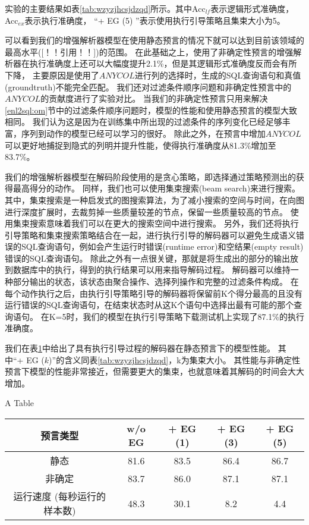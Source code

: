 实验的主要结果如表\ref{tab:wzyzjhcsjdzqd}所示。其中Acc$_{lf}$表示逻辑形式准确度，Acc$_{ex}$表示执行准确度，
“+ EG (5) ”表示使用执行引导策略且集束大小为5。

可以看到我们的增强解析器模型在使用静态预言的情况下就可以达到目前该领域的最高水平([！！引用！！])的范围。
在此基础之上，使用了非确定性预言的增强解析器在执行准确度上还可以大幅度提升2.1\%，但是其逻辑形式准确度反而会有所下降，
主要原因是使用了$ANYCOL$进行列的选择时，生成的SQL查询语句和真值(groundtruth)不能完全匹配。
我们还对过滤条件顺序问题和非确定性预言中的$ANYCOL$的贡献度进行了实验对比。
当我们的非确定性预言只用来解决\ref{enl2sql:om}节中的过滤条件顺序问题时，模型的性能和使用静态预言的模型大致相同。
我们认为这是因为在训练集中所出现的过滤条件的序列变化已经足够丰富，序列到动作的模型已经可以学习的很好。
除此之外，在预言中增加$ANYCOL$可以更好地捕捉到隐式的列明并提升性能，使得执行准确度从81.3\%增加至83.7\%。

我们的增强解析器模型在解码阶段使用的是贪心策略，即选择通过策略预测出的获得最高得分的动作。
同样，我们也可以使用集束搜索(beam search)来进行搜索。
其中，集束搜索是一种启发式的图搜索算法，为了减小搜索的空间与时间，在向图进行深度扩展时，去裁剪掉一些质量较差的节点，保留一些质量较高的节点。
使用集束搜索意味着我们可以在更大的搜索空间中进行搜索。
另外，我们还将执行引导策略和集束搜索策略结合在一起，进行执行引导的解码器可以避免生成语义错误的SQL查询语句，例如会产生运行时错误(runtime error)和空结果(empty result)错误的SQL查询语句。
除此之外有一点很关键，那就是将生成出的部分的输出放到数据库中的执行，得到的执行结果可以用来指导解码过程。
解码器可以维持一种部分输出的状态，该状态由聚合操作、选择列操作和完整的过滤条件构成。
在每个动作执行之后，由执行引导策略引导的解码器将保留前K个得分最高的且没有运行错误的SQL查询语句，在结束状态时从这K个语句中选择出最有可能的那个查询语句。
在K=5时，我们的模型在执行引导策略下载测试机上实现了87.1\%的执行准确度。

我们在表\ref{enl2sql:sybtjsdxdmxxn}中给出了具有执行引导过程的解码器在静态预言下的模型性能。
其中“+ EG ($k$)”的含义同表\ref{tab:wzyzjhcsjdzqd}，k为集束大小。
其性能与非确定性预言下模型的性能非常接近，但需要更大的集束，也就意味着其解码的时间会大大增加。

\begin{table}[!hpb]
  \centering
    {A Table}
  \label{enl2sql:sybtjsdxdmxxn}
  \begin{tabular}{ccccc} \toprule
    \textbf{预言类型} & \textbf{w/o EG} & \textbf{+ EG (1)} & \textbf{+ EG (3)} & \textbf{+ EG (5)}\\\midrule
    静态 & 81.6 & 83.5 & 86.4 & 86.7\\
    非确定 & 83.7 & 86.0 & 87.1 & 87.1\\\midrule
    运行速度 (每秒运行的样本数) & 48.3 & 30.1 & 8.2 & 4.4\\
    \bottomrule
  \end{tabular}
\end{table}

